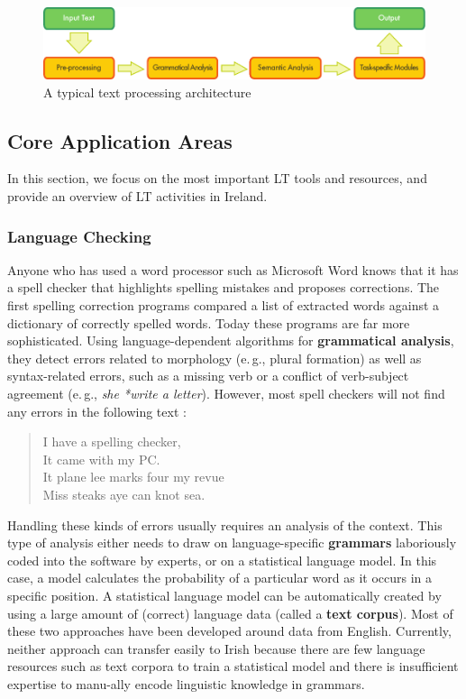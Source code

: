 \documentclass[]{../../metanetpaper}
\begin{document}
\begin{multicols}{2}
\begin{figure}[htb]
  \center
  \includegraphics[width=\textwidth]{../_media/english/text_processing_app_architecture}
  \caption{A typical text processing architecture}
  \label{fig:textprocessingarch_en}
\end{figure}

\subsection{Core Application Areas}

In this section, we focus on the most important LT tools and resources, and provide an overview of LT activities in Ireland. 

\subsubsection{Language Checking}

Anyone who has used a word processor such as Microsoft Word knows that it has a spell checker that highlights spelling mistakes and proposes corrections. The first spelling correction programs compared a list of extracted words against a dictionary of correctly spelled words. Today these programs are far more sophisticated. Using language-dependent algorithms for \textbf{grammatical analysis}, they detect errors related to morphology (e.\,g., plural formation) as well as syntax-related errors, such as a missing verb or a conflict of verb-subject agreement (e.\,g., \textit{she *write a letter}). However, most spell checkers will not find any errors in the following text \cite{zar1}:

\begin{quote}
  I have a spelling checker,\\
  It came with my PC.\\
  It plane lee marks four my revue\\
  Miss steaks aye can knot sea.
\end{quote}

Handling these kinds of errors usually requires an analysis of the context. This type of analysis either needs to draw on language-specific \textbf{grammars} laboriously coded into the software by experts, or on a statistical language model. In this case, a model calculates the probability of a particular word as it occurs in a specific position. A statistical language model can be automatically created by using a large amount of (correct) language data (called a \textbf{text corpus}). Most of these two approaches have been developed around data from English. Currently, neither approach can transfer easily to Irish because there are few language resources such as text corpora to train a statistical model and there is insufficient expertise to manu-ally encode linguistic knowledge in grammars.


\end{multicols}
\end{document}
